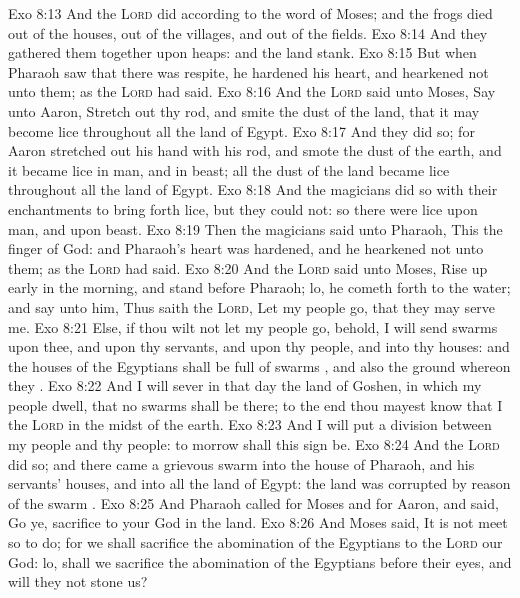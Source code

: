 \vs Exo 8:13 And the \textsc{Lord} did according to the word of Moses; and the frogs died out of the houses, out of the villages, and out of the fields.
\vs Exo 8:14 And they gathered them together upon heaps: and the land stank.
\vs Exo 8:15 But when Pharaoh saw that there was respite, he hardened his heart, and hearkened not unto them; as the \textsc{Lord} had said.
\vs Exo 8:16 And the \textsc{Lord} said unto Moses, Say unto Aaron, Stretch out thy rod, and smite the dust of the land, that it may become lice throughout all the land of Egypt.
\vs Exo 8:17 And they did so; for Aaron stretched out his hand with his rod, and smote the dust of the earth, and it became lice in man, and in beast; all the dust of the land became lice throughout all the land of Egypt.
\vs Exo 8:18 And the magicians did so with their enchantments to bring forth lice, but they could not: so there were lice upon man, and upon beast.
\vs Exo 8:19 Then the magicians said unto Pharaoh, This  the finger of God: and Pharaoh's heart was hardened, and he hearkened not unto them; as the \textsc{Lord} had said.
\vs Exo 8:20 And the \textsc{Lord} said unto Moses, Rise up early in the morning, and stand before Pharaoh; lo, he cometh forth to the water; and say unto him, Thus saith the \textsc{Lord}, Let my people go, that they may serve me.
\vs Exo 8:21 Else, if thou wilt not let my people go, behold, I will send swarms  upon thee, and upon thy servants, and upon thy people, and into thy houses: and the houses of the Egyptians shall be full of swarms , and also the ground whereon they .
\vs Exo 8:22 And I will sever in that day the land of Goshen, in which my people dwell, that no swarms  shall be there; to the end thou mayest know that I  the \textsc{Lord} in the midst of the earth.
\vs Exo 8:23 And I will put a division between my people and thy people: to morrow shall this sign be.
\vs Exo 8:24 And the \textsc{Lord} did so; and there came a grievous swarm  into the house of Pharaoh, and  his servants' houses, and into all the land of Egypt: the land was corrupted by reason of the swarm .
\vs Exo 8:25 And Pharaoh called for Moses and for Aaron, and said, Go ye, sacrifice to your God in the land.
\vs Exo 8:26 And Moses said, It is not meet so to do; for we shall sacrifice the abomination of the Egyptians to the \textsc{Lord} our God: lo, shall we sacrifice the abomination of the Egyptians before their eyes, and will they not stone us?
